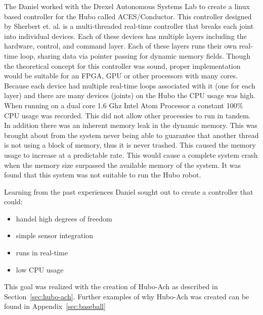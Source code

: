 The Daniel worked with the Drexel Autonomous Systems Lab to create a linux based controller for the Hubo called ACES/Conductor.
This controller designed by Sherbert et. al.\cite{aces} is a multi-threaded real-time controller that breaks each joint into individual devices. 
Each of these devices has multiple layers including the hardware, control, and command layer.
Each of these layers runs their own real-time loop, sharing data via pointer passing for dynamic memory fields.
Though the theoretical concept for this controller was sound, proper implementation would be suitable for an FPGA, GPU or other processors with many cores.
Because each device had multiple real-time loops associated with it (one for each layer) and there are many devices (joints) on the Hubo the CPU usage was high.
When running on a dual core 1.6 Ghz Intel Atom Processor a constant 100\% CPU usage was recorded.
This did not allow other processies to run in tandem.
In addition there was an inherent memory leak in the dynamic memory.
This was brought about from the system never being able to guarantee that another thread is not using a block of memory, thus it is never trashed.
This caused the memory usage to increase at a predictable rate.
This would cause a complete system crash when the memory size surpassed the available memory of the system.
It was found that this system was not suitable to run the Hubo robot.

Learning from the past experiences Daniel sought out to create a controller that could:
\begin{multicols}{2}
\begin{itemize}
\item handel high degrees of freedom
\item simple sensor integration
\item runs in real-time
\item low CPU usage
\end{itemize}
\end{multicols}

This goal was realized with the creation of Hubo-Ach as described in Section~\ref{sec:hubo-ach}. 
Further examples of why Hubo-Ach was created can be found in Appendix~\ref{sec:baseball}